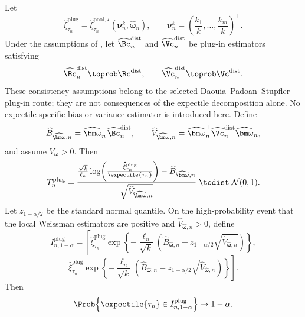 \begin{corollary}
\label{cor:pool-ext:plugin-inference}
Let
\[
  \widehat\xi_{\tau_n}^{\mathrm{plug}}
  =
  \widehat\xi_{\tau_n}^{\mathrm{pool},\star}
  (\bm\nu_n^k,\widehat{\bm\omega}_n),
  \qquad
  \bm\nu_n^k=
  \left(\frac{k_1}{k},\ldots,\frac{k_m}{k}\right)^\top.
\]
Under the assumptions of , let
\(\widehat{\Bc}^{\mathrm{dist}}_n\) and
\(\widehat{\Vc}^{\mathrm{dist}}_n\) be plug-in estimators satisfying
\[
  \widehat{\Bc}^{\mathrm{dist}}_n\toprob\Bc^{\mathrm{dist}},
  \qquad
  \widehat{\Vc}^{\mathrm{dist}}_n\toprob\Vc^{\mathrm{dist}}.
\]
These consistency assumptions belong to the selected
Daouia--Padoan--Stupfler plug-in route; they are not consequences of the
expectile decomposition alone. No expectile-specific bias or variance estimator
is introduced here.
Define
\[
  \widehat B_{\widehat{\bm\omega},n}
  =
  \widehat{\bm\omega}_n^\top\widehat{\Bc}^{\mathrm{dist}}_n,
  \qquad
  \widehat V_{\widehat{\bm\omega},n}
  =
  \widehat{\bm\omega}_n^\top
  \widehat{\Vc}^{\mathrm{dist}}_n
  \widehat{\bm\omega}_n,
\]
and assume \(V_{\bm\omega}>0\). Then
\[
  T_n^{\mathrm{plug}}
  =
  \frac{
    \frac{\sqrt{k}}{\ell_n}
    \log\!\left(
      \frac{\widehat\xi_{\tau_n}^{\mathrm{plug}}}
           {\expectile{\tau_n}}
    \right)
    -
    \widehat B_{\widehat{\bm\omega},n}
  }{
    \sqrt{\widehat V_{\widehat{\bm\omega},n}}
  }
  \;\todist\;
  \mathcal N(0,1).
\]
Let \(z_{1-\alpha/2}\) be the standard normal quantile. On the
high-probability event that the local Weissman estimators are positive and
\(\widehat V_{\widehat{\bm\omega},n}>0\), define
\[
  I_{n,1-\alpha}^{\mathrm{plug}}
  =
  \left[
  \widehat\xi_{\tau_n}^{\mathrm{plug}}
  \exp\!\left\{
    -\frac{\ell_n}{\sqrt{k}}
    \left(
      \widehat B_{\widehat{\bm\omega},n}
      +
      z_{1-\alpha/2}\sqrt{\widehat V_{\widehat{\bm\omega},n}}
    \right)
  \right\},
  \right.
\]
\[
  \left.
  \widehat\xi_{\tau_n}^{\mathrm{plug}}
  \exp\!\left\{
    -\frac{\ell_n}{\sqrt{k}}
    \left(
      \widehat B_{\widehat{\bm\omega},n}
      -
      z_{1-\alpha/2}\sqrt{\widehat V_{\widehat{\bm\omega},n}}
    \right)
  \right\}
  \right].
\]
Then
\[
  \Prob\!\left\{
    \expectile{\tau_n}\in I_{n,1-\alpha}^{\mathrm{plug}}
  \right\}
  \to
  1-\alpha.
\]
\end{corollary}

